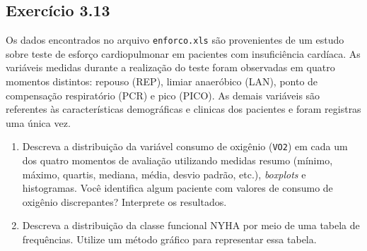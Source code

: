 \documentclass[
]{latex/krantz}
\providecommand{\tightlist}{%
  \setlength{\itemsep}{0pt}\setlength{\parskip}{0pt}}
\theoremstyle{definition}
\theoremstyle{definition}
\theoremstyle{definition}
\theoremstyle{definition}
\theoremstyle{remark}
\begin{document}
\hypertarget{exr3-13}{%
\subsection*{Exercício 3.13}\label{exr3-13}}

Os dados encontrados no arquivo \texttt{enforco.xls} \citep{Braga1998} são provenientes de um estudo sobre teste de esforço cardiopulmonar em pacientes com insuficiência cardíaca. As variáveis medidas durante a realização do teste foram observadas em quatro momentos distintos: repouso (REP), limiar anaeróbico (LAN), ponto de compensação respiratório (PCR) e pico (PICO). As demais variáveis são referentes às características demográficas e clinicas dos pacientes e foram registras uma única vez.

\begin{enumerate}
\def\labelenumi{\alph{enumi})}
\tightlist
\item
  Descreva a distribuição da variável consumo de oxigênio (\texttt{VO2}) em cada um dos quatro momentos de avaliação utilizando medidas resumo (mínimo, máximo, quartis, mediana, média, desvio padrão, etc.), \emph{boxplots} e histogramas. Você identifica algum paciente com valores de consumo de oxigênio discrepantes? Interprete os resultados.
\item
  Descreva a distribuição da classe funcional NYHA por meio de uma tabela de frequências. Utilize um método gráfico para representar essa tabela.
\end{enumerate}
\end{document}
